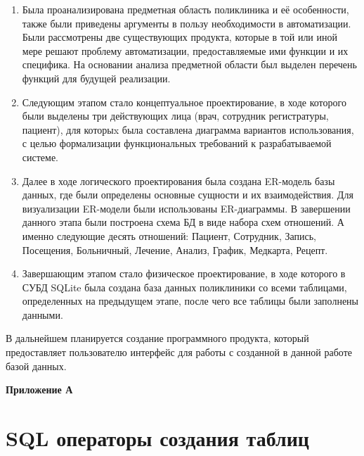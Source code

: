 \documentclass[14pt,a4paper,russian]{extreport}
\begin{document}
\begin{enumerate}[noitemsep]
        \vspace{-5pt}
    \item Была проанализирована предметная область поликлиника и её особенности, также были
        приведены аргументы в пользу необходимости в автоматизации. Были рассмотрены две существующих
        продукта, которые в той или иной мере решают проблему автоматизации, предоставляемые ими
        функции и их специфика. На основании анализа предметной области был выделен перечень
        функций для будущей реализации.
    \item Следующим этапом стало концептуальное проектирование, в ходе которого были выделены
        три 
        действующих лица (врач, сотрудник регистратуры, пациент), для которыx была составлена
        диаграмма вариантов использования, с целью формализации функциональных требований к разрабатываемой системе.
    \item Далее в ходе логического проектирования была создана ER-модель базы данных, где были
        определены основные сущности и их взаимодействия. Для визуализации ER-модели были
        использованы ER-диаграммы. В завершении данного этапа были построена схема БД в виде набора
        схем отношений. А именно следующие десять отношений: Пациент, Сотрудник, Запись, 
		Посещения, Больничный, Лечение, Анализ, График, Медкарта, Рецепт.
    \item Завершающим этапом стало физическое проектирование, в ходе которого в СУБД SQLite была
        создана база данных поликлиники со всеми таблицами, определенных на предыдущем этапе, после
        чего все таблицы были заполнены данными.
\end{enumerate}

    В дальнейшем планируется создание программного продукта, который предоставляет
        пользователю интерфейс для работы с созданной в данной работе базой данных.

{}

\newpage
\hfill\textbf{Приложение А}
\section*{SQL операторы создания таблиц}
\setcounter{lstlisting}{0}
\end{document}
